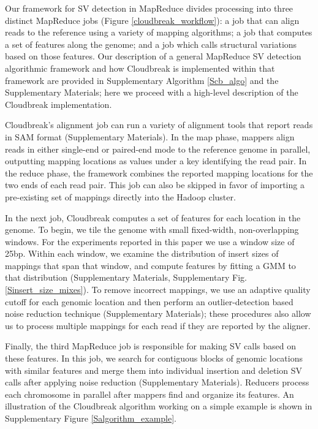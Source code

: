 \documentclass[11pt]{article}
\begin{document}
Our framework for SV detection in MapReduce divides processing into three distinct MapReduce jobs (Figure \ref{cloudbreak_workflow}): a job that can align reads to the reference using a variety of mapping algorithms; a job that computes a set of features along the genome; and a job which calls structural variations based on those features. Our description of a general MapReduce SV detection algorithmic framework and how Cloudbreak is implemented within that framework are provided in Supplementary Algorithm \ref{Scb_algo} and the Supplementary Materials; here we proceed with a high-level description of the Cloudbreak implementation.

Cloudbreak's alignment job can run a variety of alignment tools that report reads in SAM format (Supplementary Materials). In the map phase, mappers align reads in either single-end or paired-end mode to the reference genome in parallel, outputting mapping locations as values under a key identifying the read pair. In the reduce phase, the framework combines the reported mapping locations for the two ends of each read pair. This job can also be skipped in favor of importing a pre-existing set of mappings directly into the Hadoop cluster.

In the next job, Cloudbreak computes a set of features for each location in the genome. To begin, we tile the genome with small fixed-width, non-overlapping windows. For the experiments reported in this paper we use a window size of 25bp. Within each window, we examine the distribution of insert sizes of mappings that span that window, and compute features by fitting a GMM to that distribution (Supplementary Materials, Supplementary Fig. \ref{Sinsert_size_mixes}). To remove incorrect mappings, we use an adaptive quality cutoff for each genomic location and then perform an outlier-detection based noise reduction technique (Supplementary Materials); these procedures also allow us to process multiple mappings for each read if they are reported by the aligner.

Finally, the third MapReduce job is responsible for making SV calls based on these features. In this job, we search for contiguous blocks of genomic locations with similar features and merge them into individual insertion and deletion SV calls after applying noise reduction (Supplementary Materials).  Reducers process each chromosome in parallel after mappers find and organize its features. An illustration of the Cloudbreak algorithm working on a simple example is shown in Supplementary Figure \ref{Salgorithm_example}.
\end{document}
